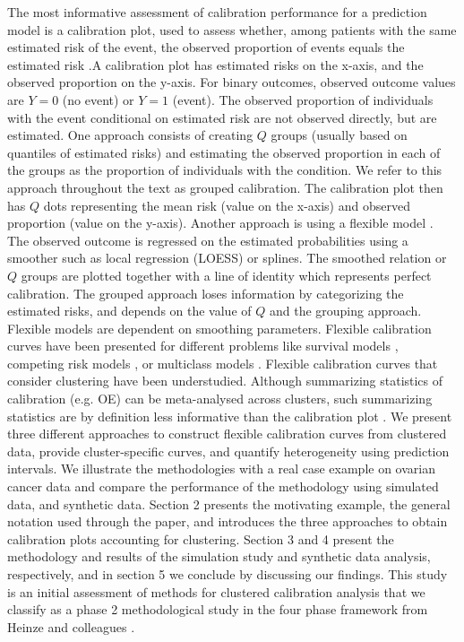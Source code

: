 The most informative assessment of calibration performance for a prediction model is a calibration plot, used to assess whether, among patients with the same estimated risk of the event, the observed proportion of events equals the estimated risk \cite{vancalsterCalibrationHierarchyRisk2016,vancalsterPerformanceEvaluationPredictive2024}.A calibration plot has estimated risks on the x-axis, and the observed proportion on the y-axis. For binary outcomes, observed outcome values are \(Y = 0\) (no event) or \(Y = 1\) (event). The observed proportion of individuals with the event conditional on estimated risk are not observed directly, but are estimated. One approach consists of creating \(Q\) groups (usually based on quantiles of estimated risks) and estimating the observed proportion in each of the groups as the proportion of individuals with the condition. We refer to this approach throughout the text as grouped calibration. The calibration plot then has \(Q\) dots representing the mean risk (value on the x-axis) and observed proportion (value on the y-axis). Another approach is using a flexible model \cite{austinGraphicalAssessmentInternal2014}. The observed outcome is regressed on the estimated probabilities using a smoother such as local regression (LOESS) or splines. The smoothed relation or \(Q\) groups are plotted together with a line of identity which represents perfect calibration. The grouped approach loses information by categorizing the estimated risks, and depends on the value of \(Q\) and the grouping approach. Flexible models are dependent on smoothing parameters. Flexible calibration curves have been presented for different problems like survival models \cite{austinGraphicalCalibrationCurves2020}, competing risk models \cite{austinGraphicalCalibrationCurves2022}, or multiclass models \cite{vanhoordeSplinebasedToolAssess2015}. Flexible calibration curves that consider clustering have been understudied. Although summarizing statistics of calibration (e.g. \gls{OE}) can be meta-analysed across clusters, such summarizing statistics are by definition less informative than the calibration plot \cite{vancalsterPerformanceEvaluationPredictive2024,debrayGuideSystematicReview2017}. We present three different approaches to construct flexible calibration curves from clustered data, provide cluster-specific curves, and quantify heterogeneity using prediction intervals. We illustrate the methodologies with a real case example on ovarian cancer data and compare the performance of the methodology using simulated data, and synthetic data. Section 2 presents the motivating example, the general notation used through the paper, and introduces the three approaches to obtain calibration plots accounting for clustering. Section 3 and 4 present the methodology and results of the simulation study and synthetic data analysis, respectively, and in section 5 we conclude by discussing our findings. This study is an initial assessment of methods for clustered calibration analysis that we classify as a phase 2 methodological study in the four phase framework from Heinze and colleagues \cite{heinzePhasesMethodologicalResearch2024}.

